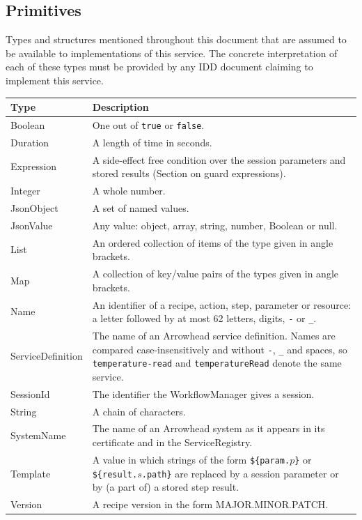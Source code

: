 \documentclass[a4paper]{arrowhead}
\newcommand{\pdef}[1]{{\textcolor{ArrowheadGrey}{#1\label{sec:model:primitives:#1}\label{sec:model:primitives:#1s}\label{sec:model:primitives:#1es}}}}
\begin{document}
\subsection{Primitives}
\label{sec:model:primitives}
Types and structures mentioned throughout this document that are assumed to be available to implementations of this
service. The concrete interpretation of each of these types must be provided by any IDD document claiming to implement
this service.

{\small
\begin{longtable}{|p{3.2cm}|p{12.6cm}|}

\hline
\rowcolor{gray!33} Type & Description \\ \hline
\endhead
\pdef{Boolean} & One out of \texttt{true} or \texttt{false}. \\ \hline
\pdef{Duration} & A length of time in seconds. \\ \hline
\pdef{Expression} & A side-effect free condition over the session parameters and stored results (Section on guard expressions). \\ \hline
\pdef{Integer} & A whole number. \\ \hline
\pdef{JsonObject} & A set of named values. \\ \hline
\pdef{JsonValue} & Any value: object, array, string, number, Boolean or null. \\ \hline
\pdef{List} & An ordered collection of items of the type given in angle brackets. \\ \hline
\pdef{Map} & A collection of key/value pairs of the types given in angle brackets. \\ \hline
\pdef{Name} & An identifier of a recipe, action, step, parameter or resource: a letter followed by at most 62 letters, digits, \texttt{-} or \texttt{\_}. \\ \hline
\pdef{ServiceDefinition} & The name of an Arrowhead service definition. Names are compared case-insensitively and without \texttt{-}, \texttt{\_} and spaces, so \texttt{temperature-\allowbreak{}read} and \texttt{temperature\allowbreak{}Read} denote the same service. \\ \hline
\pdef{SessionId} & The identifier the WorkflowManager gives a session. \\ \hline
\pdef{String} & A chain of characters. \\ \hline
\pdef{SystemName} & The name of an Arrowhead system as it appears in its certificate and in the ServiceRegistry. \\ \hline
\pdef{Template} & A value in which strings of the form \texttt{\$\{param.$p$\}} or \texttt{\$\{result.$s$.path\}} are replaced by a session parameter or by (a part of) a stored step result. \\ \hline
\pdef{Version} & A recipe version in the form MAJOR.MINOR.PATCH. \\ \hline
\end{longtable}
}
\end{document}
